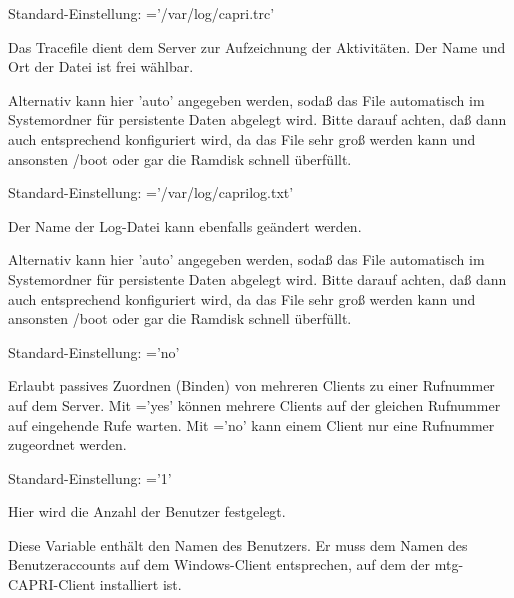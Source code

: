 \begin{description}
        Standard-Einstellung: ='/var/log/capri.trc'

        Das Tracefile dient dem Server zur Aufzeichnung der Aktivitäten. Der Name
        und Ort der Datei ist frei wählbar.

        Alternativ kann hier 'auto' angegeben werden, sodaß das File automatisch
        im Systemordner für persistente Daten abgelegt wird.
        Bitte darauf achten, daß dann auch  entsprechend konfiguriert wird,
        da das File sehr groß werden kann und ansonsten /boot oder gar die Ramdisk schnell
        überfüllt.


        Standard-Einstellung: ='/var/log/caprilog.txt'

        Der Name der Log-Datei kann ebenfalls geändert werden.

        Alternativ kann hier 'auto' angegeben werden, sodaß das File automatisch
        im Systemordner für persistente Daten abgelegt wird.
        Bitte darauf achten, daß dann auch  entsprechend konfiguriert wird,
        da das File sehr groß werden kann und ansonsten /boot oder gar die Ramdisk schnell
        überfüllt.


        Standard-Einstellung: ='no'

        Erlaubt passives Zuordnen (Binden) von mehreren Clients zu einer Rufnummer auf
        dem Server. Mit ='yes' können mehrere Clients auf
        der gleichen Rufnummer auf eingehende Rufe warten. Mit ='no'
        kann einem Client nur eine Rufnummer zugeordnet werden.


        Standard-Einstellung: ='1'

        Hier wird die Anzahl der Benutzer festgelegt.


        Diese Variable enthält den Namen des Benutzers. Er muss dem Namen des
        Benutzeraccounts auf dem Windows-Client entsprechen, auf dem der
        mtg-CAPRI-Client installiert ist.


\end{description}
